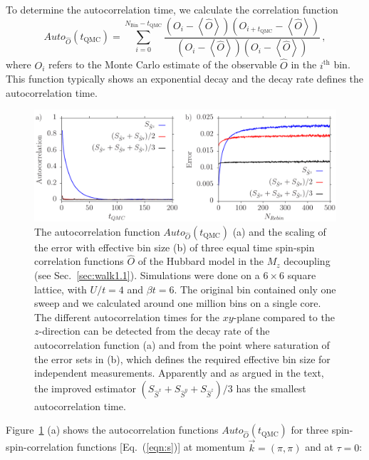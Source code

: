 To determine the autocorrelation time, we calculate the correlation function
\begin{equation}
\label{eqn:autocorrel}
	Auto_{\hat{O}}(t_{\textrm{QMC}})=\sum_{i=0}^{N_{\textrm{Bin}}-t_{\textrm{QMC}}}\frac{\left(O_i-\left\langle \hat{O}\right\rangle \right)\left(O_{i+t_{\textrm{QMC}}}-\left\langle \hat{O}\right\rangle \right)}{\left(O_i-\left\langle \hat{O}\right\rangle \right)\left(O_{i}-\left\langle \hat{O}\right\rangle \right)}\, ,
\end{equation}
where $O_i$ refers to the Monte Carlo estimate of the observable $\hat{O}$ in the $i^{\text{th}}$ bin. This function typically shows an exponential decay and the decay rate defines the autocorrelation time.
%
\begin{figure}
\includegraphics[width=1.0\textwidth]{Figures/fig1.pdf}
	\caption{\label{fig_autocorr}
	        The autocorrelation function $Auto_{\hat{O}}(t_{\textrm{QMC}})$ (a) and the scaling of the error with effective bin size (b) of three equal time spin-spin correlation functions $\hat{O}$ of the Hubbard model in the $M_z$ decoupling (see Sec.~\ref{sec:walk1.1}). Simulations were done on a $ 6 \times 6$ square lattice, with  $U/t=4$ and $\beta t = 6$.  The original bin contained only one sweep and we calculated around one million bins on a single core. The different  autocorrelation times for the $xy$-plane compared to the $z$-direction can be detected from the decay rate of the autocorrelation function (a) and from the point where saturation of the error sets in (b), which defines the required effective bin size for independent measurements. Apparently and as argued in the text, the  improved estimator $(S_{\hat{S}^{x}} + S_{\hat{S}^{y}}+ S_{\hat{S}^{z}})/3$  has the smallest autocorrelation time.
 }
\end{figure}
%
Figure~\ref{fig_autocorr} (a) shows the autocorrelation functions $Auto_{\hat{O}}(t_{\textrm{QMC}})$ for three spin-spin-correlation functions [Eq.~(\ref{eqn:s})] at momentum $\vec{k}=(\pi,\pi)$ and at $\tau=0$: 

